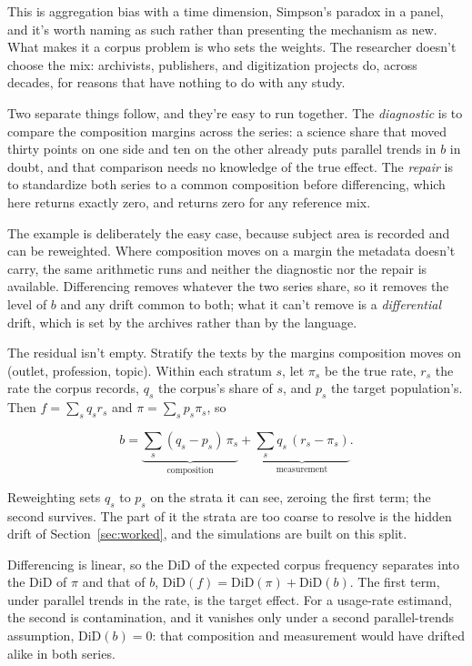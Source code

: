 This is aggregation bias with a time dimension, Simpson's paradox in a panel, and it's worth naming as such rather than presenting the mechanism as new. What makes it a corpus problem is who sets the weights. The researcher doesn't choose the mix: archivists, publishers, and digitization projects do, across decades, for reasons that have nothing to do with any study.

Two separate things follow, and they're easy to run together. The \emph{diagnostic} is to compare the composition margins across the series: a science share that moved thirty points on one side and ten on the other already puts parallel trends in $b$ in doubt, and that comparison needs no knowledge of the true effect. The \emph{repair} is to standardize both series to a common composition before differencing, which here returns exactly zero, and returns zero for any reference mix.

The example is deliberately the easy case, because subject area is recorded and can be reweighted. Where composition moves on a margin the metadata doesn't carry, the same arithmetic runs and neither the diagnostic nor the repair is available. Differencing removes whatever the two series share, so it removes the level of $b$ and any drift common to both; what it can't remove is a \emph{differential} drift, which is set by the archives rather than by the language.

The residual isn't empty. Stratify the texts by the margins composition moves on (outlet, profession, topic). Within each stratum $s$, let $\pi_s$ be the true rate, $r_s$ the rate the corpus records, $q_s$ the corpus's share of $s$, and $p_s$ the target population's. Then $f = \sum_s q_s r_s$ and $\pi = \sum_s p_s \pi_s$, so

\[
b = \underbrace{\sum_s (q_s - p_s)\,\pi_s}_{\text{composition}} + \underbrace{\sum_s q_s\,(r_s - \pi_s)}_{\text{measurement}}.
\]

Reweighting sets $q_s$ to $p_s$ on the strata it can see, zeroing the first term; the second survives. The part of it the strata are too coarse to resolve is the hidden drift of Section~\ref{sec:worked}, and the simulations are built on this split.

Differencing is linear, so the DiD of the expected corpus frequency separates into the DiD of $\pi$ and that of $b$, $\mathrm{DiD}(f) = \mathrm{DiD}(\pi) + \mathrm{DiD}(b)$. The first term, under parallel trends in the rate, is the target effect. For a usage-rate estimand, the second is contamination, and it vanishes only under a second parallel-trends assumption, $\mathrm{DiD}(b) = 0$: that composition and measurement would have drifted alike in both series.

